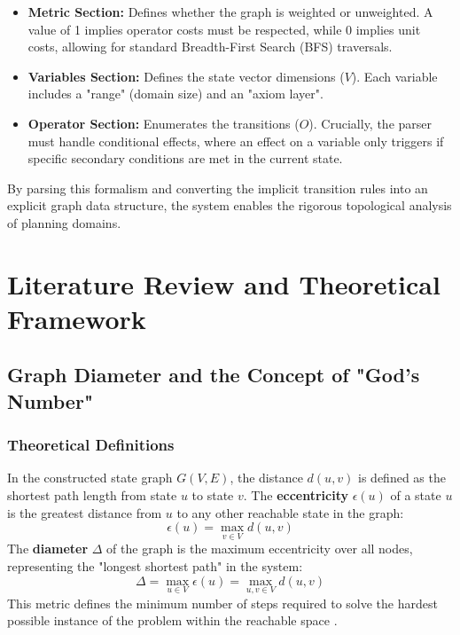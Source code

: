 \documentclass[12pt,a4paper]{report}
\begin{document}
\begin{itemize}
    \item \textbf{Metric Section:} Defines whether the graph is weighted or unweighted. A value of 1 implies operator costs must be respected, while 0 implies unit costs, allowing for standard Breadth-First Search (BFS) traversals.
    \item \textbf{Variables Section:} Defines the state vector dimensions ($V$). Each variable includes a "range" (domain size) and an "axiom layer".
    \item \textbf{Operator Section:} Enumerates the transitions ($O$). Crucially, the parser must handle conditional effects, where an effect on a variable only triggers if specific secondary conditions are met in the current state.
\end{itemize}

By parsing this formalism and converting the implicit transition rules into an explicit graph data structure, the system enables the rigorous topological analysis of planning domains.

\chapter{Literature Review and Theoretical Framework}

\section{Graph Diameter and the Concept of "God's Number"}

\subsection{Theoretical Definitions}
In the constructed state graph $G(V, E)$, the distance $d(u, v)$ is defined as the shortest path length from state $u$ to state $v$. The \textbf{eccentricity} $\epsilon(u)$ of a state $u$ is the greatest distance from $u$ to any other reachable state in the graph:
\[
\epsilon(u) = \max_{v \in V} d(u, v)
\]
The \textbf{diameter} $\Delta$ of the graph is the maximum eccentricity over all nodes, representing the "longest shortest path" in the system:
\[
\Delta = \max_{u \in V} \epsilon(u) = \max_{u, v \in V} d(u, v)
\]
This metric defines the minimum number of steps required to solve the hardest possible instance of the problem within the reachable space \cite{westGraphTheory}.
\end{document}
